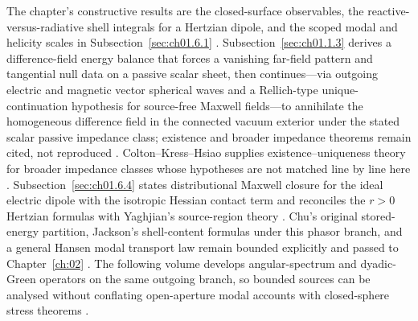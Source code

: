 The chapter's constructive results are the closed-surface observables, the reactive-versus-radiative shell integrals for a Hertzian dipole, and the scoped modal and helicity scales in Subsection~\ref{sec:ch01.6.1} \cite{stratton1941,harrington2001,chu1948}. Subsection~\ref{sec:ch01.1.3} derives a difference-field energy balance that forces a vanishing far-field pattern and tangential null data on a passive scalar sheet, then continues---via outgoing electric and magnetic vector spherical waves and a Rellich-type unique-continuation hypothesis for source-free Maxwell fields---to annihilate the homogeneous difference field in the connected vacuum exterior under the stated scalar passive impedance class; existence and broader impedance theorems remain cited, not reproduced \cite{sommerfeld1949,harrington2001}. Colton--Kress--Hsiao supplies existence--uniqueness theory for broader impedance classes whose hypotheses are not matched line by line here \cite{colton1981impedance}. Subsection~\ref{sec:ch01.6.4} states distributional Maxwell closure for the ideal electric dipole with the isotropic Hessian contact term and reconciles the $r>0$ Hertzian formulas with Yaghjian's source-region theory \cite{yaghjian1980dyadic,yaghjian1982}. Chu's original stored-energy partition, Jackson's shell-content formulas under this phasor branch, and a general Hansen modal transport law remain bounded explicitly and passed to Chapter~\ref{ch:02} \cite{jackson1999,chu1948,tai1994}. The following volume develops angular-spectrum and dyadic-Green operators on the same outgoing branch, so bounded sources can be analysed without conflating open-aperture modal accounts with closed-sphere stress theorems \cite{harrington2001}.

